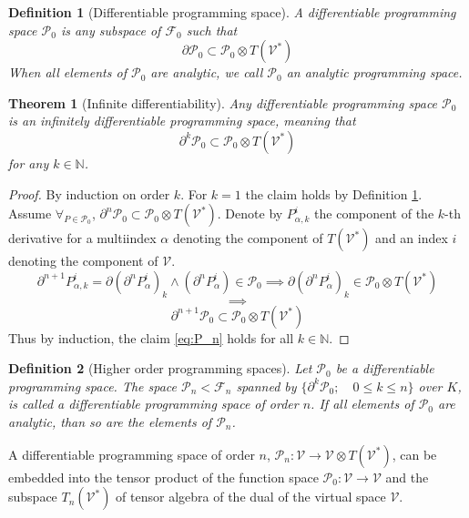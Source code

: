 \documentclass[smallcondensed]{svjour3}
\newcommand{\VV}{\mathcal{V}}
\newcommand{\F}{\mathcal{F}}
\newcommand{\dP}{\mathcal{P}}
\newcommand{\D}{\partial}
\newtheorem{definicija}{Definition}[section]
\newtheorem{izrek}{Theorem}[section]
\begin{document}
 
 \begin{definicija}[Differentiable programming space]\label{def:dP}
 	A \emph{differentiable programming space} $\dP_0$ is any subspace of $\F_0$ such that
 	\begin{equation}\label{eq:P}
 	\D\dP_0\subset\dP_0\otimes T(\VV^*)
 	\end{equation}
 	When all elements of $\dP_0$ are analytic, we call $\dP_0$ an \emph{analytic programming space}.
 \end{definicija}
 
\begin{izrek}[Infinite differentiability]\label{izr:P}
	Any differentiable programming space $\dP_0$ is an
  infinitely differentiable programming space, meaning that
	\begin{equation}\label{eq:P_n}
	 		\D^k\dP_0\subset\dP_0\otimes T(\VV^*)
	 	\end{equation}
for any $k\in\mathbb{N}$.
\end{izrek}
\begin{proof} By induction on order $k$. For $k=1$ the claim holds by Definition
  \ref{def:dP}. Assume	$\forall_{P\in\dP_0}$,
  $\D^n\dP_0\subset\dP_0\otimes T(\VV^*)$. Denote by $P_{\alpha,k}^i$ the
  component of the $k$-th derivative for a multiindex $\alpha$  denoting the
  component of $T(\VV^*)$ and an index $i$ denoting the component of $\VV$.
	\begin{equation}\label{eq:inductionStep}
\D^{n+1}P_{\alpha,k}^i=\D(\D^n P^i_\alpha)_k\land(\D^n P^i_\alpha)\in\dP_0\implies \D(\D^n P^i_\alpha)_k\in \dP_0\otimes T(\VV^*)
	\end{equation}
	$$\implies$$
	$$\D^{n+1}\dP_0\subset\dP_0\otimes T(\VV^*)$$
Thus by induction, the claim \eqref{eq:P_n} holds for all $k\in \mathbb{N}$. 
\end{proof}

\begin{definicija}[Higher order programming spaces]\label{def:P_n}
Let $\dP_0$ be a differentiable programming space. The space $\dP_n<\F_n$ spanned by $\{\D^k\dP_0;\quad 0\le k\le n\}$ over $K$, is called a differentiable programming space of order $n$. 
If all elements of $\dP_0$ are analytic, than so are the elements of $\dP_n$.
\end{definicija}


 \begin{corollary}\label{izr:P_n}
 	A differentiable programming space of order $n$, $\dP_n:\VV\to \VV\otimes T(\VV^*)$, can be embedded into the tensor
  product of the function space $\dP_0:\VV\to \VV$ and the subspace $T_n(\VV^*)$ of
  tensor algebra of the dual of the virtual space $\VV$.
 \end{corollary}
 
\end{document}
